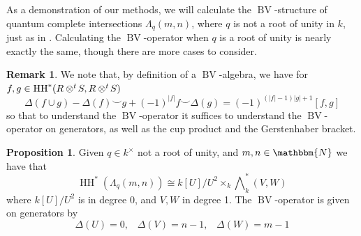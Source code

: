 \documentclass{article}
\newcommand{\HH}{\operatorname{HH}}
\newcommand{\twisten}{\otimes^t\hspace{-1pt}}
\newcommand{\bv}{\operatorname{BV}}
\theoremstyle{plain}
\theoremstyle{definition}
\newtheorem{remark}[theorem]{Remark}
\newtheorem{proposition}[theorem]{Proposition}
\begin{document}
As a demonstration of our methods, we will calculate the $\bv$-structure of quantum complete intersections $\Lambda_q(m,n)$, where $q$ is not a root of unity in $k$, just as in \cite{BriggsWitherspoon}. Calculating the $\bv$-operator when $q$ is a root of unity is nearly exactly the same, though there are more cases to consider.
\begin{remark} We note that, by definition of a $\bv$-algebra, we have for $f, g \in \HH^*(R \twisten S, R \twisten S)$ 
$$\Delta(f\cup g) -\Delta(f) \smile g + (-1)^{|f|} f\smile \Delta(g) = (-1)^{(|f|-1)|g|+1}[f,g]$$
so that to understand the $\bv$-operator it suffices to understand the $\bv$-operator on generators, as well as the cup product and the Gerstenhaber bracket. 
\end{remark}
\begin{proposition} Given $q\in k^\times$ not a root of unity, and $m, n\in \mathbbm{N}$ we have that
$$\HH^*(\Lambda_q(m,n)) \cong k[U]/U^2 \times_k \bigwedge\nolimits^*_k(V,W)$$
where $k[U]/U^2$ is in degree $0$, and $V,W$ in degree 1. The $\bv$-operator is given on generators by
$$\Delta(U)=0, \hspace{10pt}\Delta(V) =n-1, \hspace{10pt}\Delta(W) =m-1 $$
\end{proposition}
\end{document}
